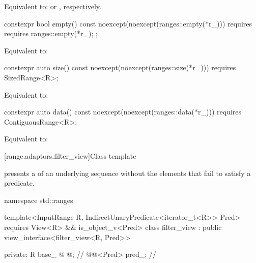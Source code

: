 \begin{addedblock}
\begin{itemdescr}
\pnum
\effects Equivalent to: 
or , respectively.
\end{itemdescr}

%
\begin{itemdecl}
constexpr bool empty() const
  noexcept(noexcept(ranges::empty(*r_)))
  requires requires { ranges::empty(*r_); };
\end{itemdecl}

\begin{itemdescr}
\pnum
\effects Equivalent to: 
\end{itemdescr}

%
\begin{itemdecl}
constexpr auto size() const
  noexcept(noexcept(ranges::size(*r_)))
  requires SizedRange<R>;
\end{itemdecl}

\begin{itemdescr}
\pnum
\effects Equivalent to: 
\end{itemdescr}

%
\begin{itemdecl}
constexpr auto data() const
  noexcept(noexcept(ranges::data(*r_)))
  requires ContiguousRange<R>;
\end{itemdecl}

\begin{itemdescr}
\pnum
\effects Equivalent to: 
\end{itemdescr}

[range.adaptors.filter_view]{Class template }

\pnum
{} presents a  of an underlying sequence
without the elements that fail to satisfy a predicate.

\pnum
\begin{example}
\end{example}

\begin{codeblock}
namespace std::ranges {
  template<InputRange R, IndirectUnaryPredicate<iterator_t<R>> Pred>
    requires View<R> && is_object_v<Pred>
  class filter_view : public view_interface<filter_view<R, Pred>> {
  private:
    R base_ @\oldtxt{\{\}} @;                              // \expos
    @@<Pred> pred_;                 // \expos

}}
\end{codeblock}
\end{addedblock}
